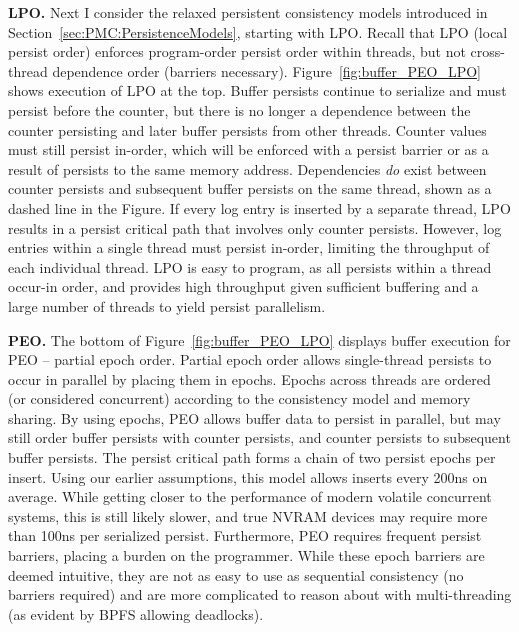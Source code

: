 \textbf{LPO.} Next I consider the relaxed persistent consistency models introduced in Section~\ref{sec:PMC:PersistenceModels}, starting with LPO.
Recall that LPO (local persist order) enforces program-order persist order within threads, but not cross-thread dependence order (barriers necessary).
Figure~\ref{fig:buffer_PEO_LPO} shows execution of LPO at the top.
Buffer persists continue to serialize and must persist before the counter, but there is no longer a dependence between the counter persisting and later buffer persists from other threads.
Counter values must still persist in-order, which will be enforced with a persist barrier or as a result of persists to the same memory address.
Dependencies \emph{do} exist between counter persists and subsequent buffer persists on the same thread, shown as a dashed line in the Figure.
If every log entry is inserted by a separate thread, LPO results in a persist critical path that involves only counter persists.
However, log entries within a single thread must persist in-order, limiting the throughput of each individual thread.
LPO is easy to program, as all persists within a thread occur-in order, and provides high throughput given sufficient buffering and a large number of threads to yield persist parallelism.

\textbf{PEO.} The bottom of Figure~\ref{fig:buffer_PEO_LPO} displays buffer execution for PEO -- partial epoch order.
Partial epoch order allows single-thread persists to occur in parallel by placing them in epochs.
Epochs across threads are ordered (or considered concurrent) according to the consistency model and memory sharing.
By using epochs, PEO allows buffer data to persist in parallel, but may still order buffer persists with counter persists, and counter persists to subsequent buffer persists.
The persist critical path forms a chain of two persist epochs per insert.
Using our earlier assumptions, this model allows inserts every 200ns on average.
While getting closer to the performance of modern volatile concurrent systems, this is still likely slower, and true NVRAM devices may require more than 100ns per serialized persist.
Furthermore, PEO requires frequent persist barriers, placing a burden on the programmer.
While these epoch barriers are deemed intuitive, they are not as easy to use as sequential consistency (no barriers required) and are more complicated to reason about with multi-threading (as evident by BPFS allowing deadlocks).

